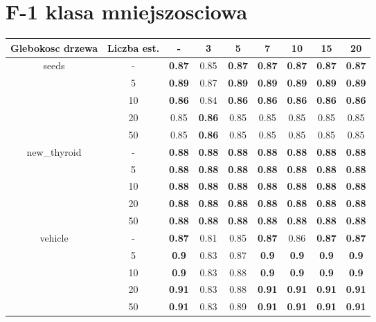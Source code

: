 \documentclass{article}%
\begin{document}
\section*{F{-}1 klasa mniejszosciowa}%
\begin{tabular}{c|c|ccccccc}%
\hline%
Glebokosc drzewa&Liczba est.&{-}&3&5&7&10&15&20\\%
\hline%
\multirow{5}{*}{seeds}&{-}&\textbf{0.87}&0.85&\textbf{0.87}&\textbf{0.87}&\textbf{0.87}&\textbf{0.87}&\textbf{0.87}\\%
\cline{2%
-%
9}%
&5&\textbf{0.89}&0.87&\textbf{0.89}&\textbf{0.89}&\textbf{0.89}&\textbf{0.89}&\textbf{0.89}\\%
\cline{2%
-%
9}%
&10&\textbf{0.86}&0.84&\textbf{0.86}&\textbf{0.86}&\textbf{0.86}&\textbf{0.86}&\textbf{0.86}\\%
\cline{2%
-%
9}%
&20&0.85&\textbf{0.86}&0.85&0.85&0.85&0.85&0.85\\%
\cline{2%
-%
9}%
&50&0.85&\textbf{0.86}&0.85&0.85&0.85&0.85&0.85\\%
\hline%
\multirow{5}{*}{new\_thyroid}&{-}&\textbf{0.88}&\textbf{0.88}&\textbf{0.88}&\textbf{0.88}&\textbf{0.88}&\textbf{0.88}&\textbf{0.88}\\%
\cline{2%
-%
9}%
&5&\textbf{0.88}&\textbf{0.88}&\textbf{0.88}&\textbf{0.88}&\textbf{0.88}&\textbf{0.88}&\textbf{0.88}\\%
\cline{2%
-%
9}%
&10&\textbf{0.88}&\textbf{0.88}&\textbf{0.88}&\textbf{0.88}&\textbf{0.88}&\textbf{0.88}&\textbf{0.88}\\%
\cline{2%
-%
9}%
&20&\textbf{0.88}&\textbf{0.88}&\textbf{0.88}&\textbf{0.88}&\textbf{0.88}&\textbf{0.88}&\textbf{0.88}\\%
\cline{2%
-%
9}%
&50&\textbf{0.88}&\textbf{0.88}&\textbf{0.88}&\textbf{0.88}&\textbf{0.88}&\textbf{0.88}&\textbf{0.88}\\%
\hline%
\multirow{5}{*}{vehicle}&{-}&\textbf{0.87}&0.81&0.85&\textbf{0.87}&0.86&\textbf{0.87}&\textbf{0.87}\\%
\cline{2%
-%
9}%
&5&\textbf{0.9}&0.83&0.87&\textbf{0.9}&\textbf{0.9}&\textbf{0.9}&\textbf{0.9}\\%
\cline{2%
-%
9}%
&10&\textbf{0.9}&0.83&0.88&\textbf{0.9}&\textbf{0.9}&\textbf{0.9}&\textbf{0.9}\\%
\cline{2%
-%
9}%
&20&\textbf{0.91}&0.83&0.88&\textbf{0.91}&\textbf{0.91}&\textbf{0.91}&\textbf{0.91}\\%
\cline{2%
-%
9}%
&50&\textbf{0.91}&0.83&0.89&\textbf{0.91}&\textbf{0.91}&\textbf{0.91}&\textbf{0.91}\\%

\end{tabular}
\end{document}

